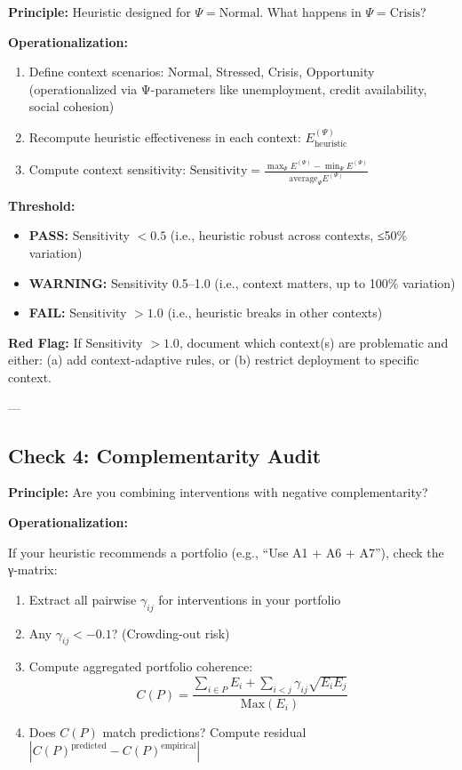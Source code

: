 \textbf{Principle:} Heuristic designed for $\Psi = \text{Normal}$. What happens in $\Psi = \text{Crisis}$?

\textbf{Operationalization:}

\begin{enumerate}
\item Define context scenarios: Normal, Stressed, Crisis, Opportunity (operationalized via Ψ-parameters like unemployment, credit availability, social cohesion)
\item Recompute heuristic effectiveness in each context: $E_{\text{heuristic}}^{(\Psi)}$
\item Compute context sensitivity: $\text{Sensitivity} = \frac{\max_\Psi E^{(\Psi)} - \min_\Psi E^{(\Psi)}}{\text{average}_\Psi E^{(\Psi)}}$
\end{enumerate}

\textbf{Threshold:}
\begin{itemize}[nosep]
\item \textbf{PASS:} Sensitivity $< 0.5$ (i.e., heuristic robust across contexts, ≤50\% variation)
\item \textbf{WARNING:} Sensitivity 0.5--1.0 (i.e., context matters, up to 100\% variation)
\item \textbf{FAIL:} Sensitivity $> 1.0$ (i.e., heuristic breaks in other contexts)
\end{itemize}

\textbf{Red Flag:} If Sensitivity $> 1.0$, document which context(s) are problematic and either: (a) add context-adaptive rules, or (b) restrict deployment to specific context.

---

\subsection{Check 4: Complementarity Audit}
\label{subsec:20-check-4}

\textbf{Principle:} Are you combining interventions with negative complementarity?

\textbf{Operationalization:}

If your heuristic recommends a portfolio (e.g., ``Use A1 + A6 + A7''), check the γ-matrix:

\begin{enumerate}
\item Extract all pairwise $\gamma_{ij}$ for interventions in your portfolio
\item Any $\gamma_{ij} < -0.1$? (Crowding-out risk)
\item Compute aggregated portfolio coherence:
\begin{equation}
C(P) = \frac{\sum_{i \in P} E_i + \sum_{i < j} \gamma_{ij} \sqrt{E_i E_j}}{\text{Max}(E_i)}
\end{equation}
\item Does $C(P)$ match predictions? Compute residual $|C(P)^{\text{predicted}} - C(P)^{\text{empirical}}|$
\end{enumerate}

